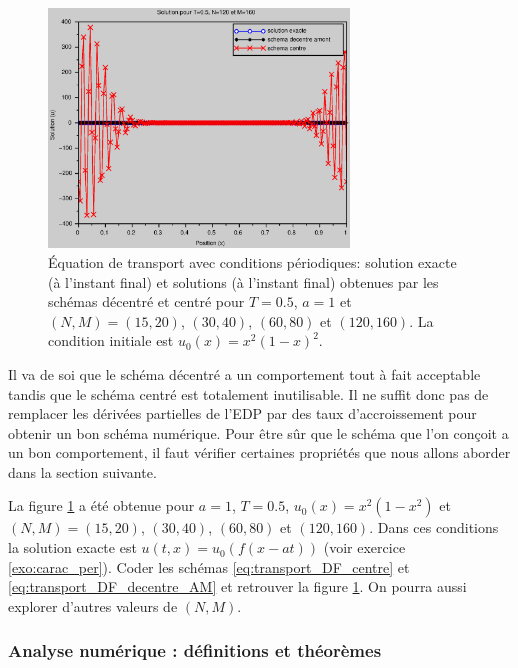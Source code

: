 \documentclass[12pt,a4paper,twoside]{article}
\begin{document}
\begin{figure}[h]
  \includegraphics[width = 8cm]{Figures/transport_per_N120.eps}
  \caption{\'Equation de transport avec conditions p\'eriodiques: solution exacte (\`a 
    l'instant final) et
    solutions (\`a l'instant final) 
    obtenues par les sch\'emas d\'ecentr\'e et centr\'e pour $T=0.5$, $a=1$ et
    $(N,M) = (15,20)$, $(30,40)$, $(60,80)$ et $(120,160)$.
    La condition initiale est $u_0(x) = x^2(1-x)^2$.}
  \label{fig:trans_per}
\end{figure}


Il va de soi que le sch\'ema d\'ecentr\'e a un comportement tout \`a fait acceptable
tandis que le sch\'ema centr\'e est totalement inutilisable.
Il ne suffit donc pas de remplacer les d\'eriv\'ees
partielles de l'EDP par des taux d'accroissement pour obtenir un bon sch\'ema num\'erique.
Pour \^etre s\^ur que le sch\'ema que l'on con\c{c}oit a un bon comportement,
il faut v\'erifier certaines propri\'et\'es que nous allons aborder dans la section suivante.


\begin{exercise}
  La figure \ref{fig:trans_per} a \'et\'e obtenue pour $a=1$, $T=0.5$, $u_0(x) = x^2(1-x^2)$
  et $(N,M) = (15,20)$, $(30,40)$, $(60,80)$ et $(120,160)$.
  Dans ces conditions la solution exacte est $u(t,x) = u_0(f(x-at))$
  (voir exercice \ref{exo:carac_per}).
  Coder les sch\'emas \eqref{eq:transport_DF_centre} et \eqref{eq:transport_DF_decentre_AM}
  et retrouver la figure \ref{fig:trans_per}.
  On pourra aussi explorer d'autres valeurs de $(N,M)$.
\end{exercise}

\subsubsection{Analyse num\'erique : d\'efinitions et th\'eor\`emes}
\label{subsubsec:analyse_def}
\end{document}
